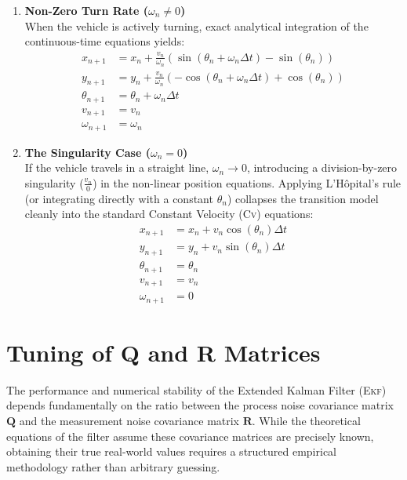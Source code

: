 \begin{enumerate}[label=\textbf{Case \Alph*:}, leftmargin=*, itemsep=1em]
	
	\item \textbf{Non-Zero Turn Rate ($\omega_n \neq 0$)}\\
	When the vehicle is actively turning, exact analytical integration of the continuous-time equations yields:
	\begin{align}
		x_{n+1} &= x_n + \frac{v_n}{\omega_n} \left( \sin(\theta_n + \omega_n \Delta t) - \sin(\theta_n) \right) \\
		y_{n+1} &= y_n + \frac{v_n}{\omega_n} \left( -\cos(\theta_n + \omega_n \Delta t) + \cos(\theta_n) \right) \\
		\theta_{n+1} &= \theta_n + \omega_n \Delta t \\
		v_{n+1} &= v_n \\
		\omega_{n+1} &= \omega_n
	\end{align}
	
	\item \textbf{The Singularity Case ($\omega_n = 0$)}\\
	If the vehicle travels in a straight line, $\omega_n \to 0$, introducing a division-by-zero singularity ($\frac{v_n}{0}$) in the non-linear position equations. Applying L'H\^{o}pital's rule (or integrating directly with a constant $\theta_n$) collapses the transition model cleanly into the standard Constant Velocity (\textsc{Cv}) equations:
	\begin{align}
		x_{n+1} &= x_n + v_n \cos(\theta_n) \Delta t \\
		y_{n+1} &= y_n + v_n \sin(\theta_n) \Delta t \\
		\theta_{n+1} &= \theta_n \\
		v_{n+1} &= v_n \\
		\omega_{n+1} &= 0
	\end{align}
	
\end{enumerate}

\section{Tuning of Q and R Matrices}
\label{sec:tuning_q_r}

The performance and numerical stability of the Extended Kalman Filter (\textsc{Ekf}) depends fundamentally on the ratio between the process noise covariance matrix $\mathbf{Q}$ and the measurement noise covariance matrix $\mathbf{R}$.%
While the theoretical equations of the filter assume these covariance matrices are precisely known, obtaining their true real-world values requires a structured empirical methodology rather than arbitrary guessing.

